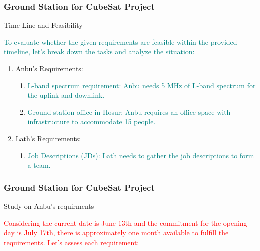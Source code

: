 \newpage
\begin{frame}
\frametitle{Ground Station for CubeSat Project }
\begin{block}{ Time Line and Feasibility}

\textcolor{teal}{
To evaluate whether the given requirements are feasible within the provided timeline, let's break down the tasks and analyze the situation:}


\begin{enumerate}
    \item  Anbu's Requirements:
    
    \begin{enumerate}
        \item  \textcolor{teal}{ L-band spectrum requirement: Anbu needs 5 MHz of L-band spectrum for the uplink and downlink.}
        \item \textcolor{teal}{ Ground station office in Hosur: Anbu requires an office space with infrastructure to accommodate 15 people.}
    \end{enumerate}
    
    \item  Lath's Requirements:
       \begin{enumerate}
        \item  \textcolor{teal}{Job Descriptions (JDs): Lath needs to gather the job descriptions to form a team.}
     \end{enumerate}
    
\end{enumerate}

 
\end{block}
\end{frame}


\newpage
\begin{frame}
\frametitle{Ground Station for CubeSat Project }
\begin{block}{Study on Anbu's requirments }


\textcolor{red}{Considering the current date is June 13th and the commitment for the opening day is July 17th, there is approximately one month available to fulfill the requirements. Let's assess each requirement:}




 
\end{block}
\end{frame}


